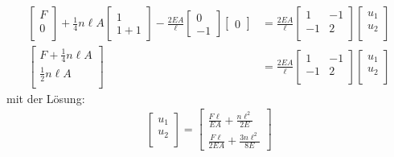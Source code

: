 \documentclass[letterpaper,10pt,german]{jupyterBook}
\begin{document}
\label{equation:chapters/chapter2/1dFEM:b775fa83-2f53-4adc-8cd4-7bdc34d97a01}\begin{align}
\begin{bmatrix}
F \\
0 \\
\end{bmatrix} + \frac{1}{4}n\ell A \begin{bmatrix}
1 \\
1+1
\end{bmatrix} - \frac{2EA}{\ell}\begin{bmatrix}
 0\\
-1
\end{bmatrix} \begin{bmatrix}
0
\end{bmatrix} & = \frac{2EA}{\ell}\begin{bmatrix}
1 & -1\\
-1 & 2 \\
\end{bmatrix} \begin{bmatrix}
u_1 \\
u_2\\
\end{bmatrix} \\
\begin{bmatrix}
F +\frac{1}{4}n\ell A \\
\frac{1}{2}n\ell A \\
\end{bmatrix} & =
\frac{2EA}{\ell}\begin{bmatrix}
1 & -1\\
-1 & 2 \\
\end{bmatrix} \begin{bmatrix}
u_1 \\
u_2\\
\end{bmatrix} 
\end{align}
\sphinxAtStartPar
mit der Lösung:
\label{equation:chapters/chapter2/1dFEM:79272a4c-565a-45be-b6df-287448c00311}\begin{align}
\begin{bmatrix}
u_1 \\
u_2\\
\end{bmatrix} = \begin{bmatrix}
 \frac{F\ell}{EA} + \frac{n \ell^2}{2E}\\
\frac{F\ell}{2EA} + \frac{3 n \ell^2}{8E}
\end{bmatrix} 
\end{align}
\end{document}
